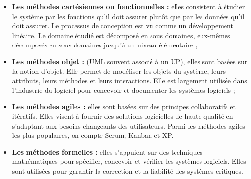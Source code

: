 \begin{itemize}
  \item \textbf{Les méthodes cartésiennes ou fonctionnelles :} elles consistent
    à étudier le système par les fonctions qu'il doit assurer plutôt que par
    les données qu'il doit assurer. Le processus de conception est vu comme un
    développement linéaire.  Le domaine étudié est décomposé en sous domaines,
    eux-mêmes décomposés en sous domaines jusqu'à un niveau élémentaire ;

  \item \textbf{Les méthodes objet :} (\ac{UML} souvent associé à un \ac{UP}), elles
    sont basées sur la notion d’objet. Elle permet de modéliser les objets du
    système, leurs attributs, leurs méthodes et leurs interactions. Elle est
    largement utilisée dans l’industrie du logiciel pour concevoir et documenter
    les systèmes logiciels ;

  \item \textbf {Les méthodes agiles :} elles sont basées sur des principes
    collaboratifs et itératifs. Elles visent à fournir des solutions logicielles
    de haute qualité en s’adaptant aux besoins changeants des utilisateurs.
    Parmi les méthodes agiles les plus populaires, on compte Scrum, Kanban
    et \ac{XP}.

  \item \textbf{Les méthodes formelles :} elles s'appuient sur des techniques
    mathématiques pour spécifier, concevoir et vérifier les systèmes logiciels.
    Elles sont utilisées pour garantir la correction et la fiabilité des systèmes
    critiques.

\end{itemize}

\newpage

